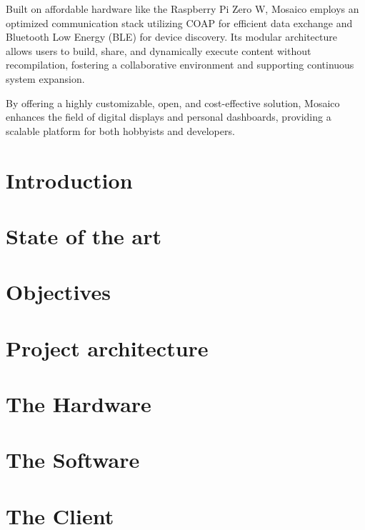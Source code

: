 \documentclass[12pt,a4paper,twoside]{book}
\begin{document}
Built on affordable hardware like the Raspberry Pi Zero W, Mosaico employs an optimized communication stack utilizing COAP for efficient data exchange and Bluetooth Low Energy (BLE) for device discovery. Its modular architecture allows users to build, share, and dynamically execute content without recompilation, fostering a collaborative environment and supporting continuous system expansion.

By offering a highly customizable, open, and cost-effective solution, Mosaico enhances the field of digital displays and personal dashboards, providing a scalable platform for both hobbyists and developers.

\tableofcontents
\setcounter{chapter}{0}

\chapter{Introduction}
\setcounter{page}{1}
\pagestyle{plain}
\raggedbottom


\chapter{State of the art}


\chapter{Objectives}


\chapter{Project architecture}


\chapter{The Hardware}


\chapter{The Software}

    
\chapter{The Client}

\end{document}
